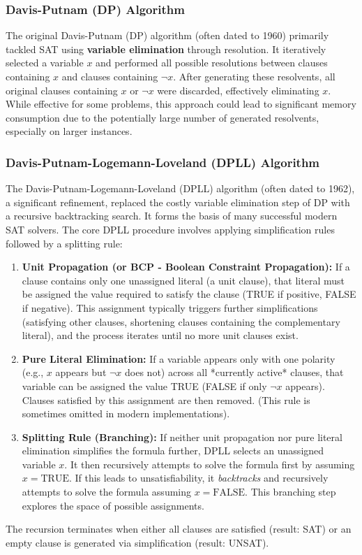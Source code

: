 \documentclass[12pt, a4paper]{article}
\begin{document}
\subsubsection{Davis-Putnam (DP) Algorithm}
\label{subsubsec:dp}

The original Davis-Putnam (DP) algorithm (often dated to 1960) primarily tackled SAT using \textbf {variable elimination} through resolution. It iteratively selected a variable $x$ and performed all possible resolutions between clauses containing $x$ and clauses containing $\lnot x$. After generating these resolvents, all original clauses containing $x$ or $\lnot x$ were discarded, effectively eliminating $x$. While effective for some problems, this approach could lead to significant memory consumption due to the potentially large number of generated resolvents, especially on larger instances.

\subsubsection{Davis-Putnam-Logemann-Loveland (DPLL) Algorithm}
\label{subsubsec:dpll}

The Davis-Putnam-Logemann-Loveland (DPLL) algorithm (often dated to 1962), a significant refinement, replaced the costly variable elimination step of DP with a recursive backtracking search. It forms the basis of many successful modern SAT solvers. The core DPLL procedure involves applying simplification rules followed by a splitting rule:

\begin{enumerate}
    \item \textbf{Unit Propagation (or BCP - Boolean Constraint Propagation):} If a clause contains only one unassigned literal (a unit clause), that literal must be assigned the value required to satisfy the clause (TRUE if positive, FALSE if negative). This assignment typically triggers further simplifications (satisfying other clauses, shortening clauses containing the complementary literal), and the process iterates until no more unit clauses exist.
    \item \textbf{Pure Literal Elimination:} If a variable appears only with one polarity (e.g., $x$ appears but $\lnot x$ does not) across all *currently active* clauses, that variable can be assigned the value TRUE (FALSE if only $\lnot x$ appears). Clauses satisfied by this assignment are then removed. (This rule is sometimes omitted in modern implementations).
    \item \textbf{Splitting Rule (Branching):} If neither unit propagation nor pure literal elimination simplifies the formula further, DPLL selects an unassigned variable $x$. It then recursively attempts to solve the formula first by assuming $x = \text{TRUE}$. If this leads to unsatisfiability, it \emph{backtracks} and recursively attempts to solve the formula assuming $x = \text{FALSE}$. This branching step explores the space of possible assignments.
\end{enumerate}
The recursion terminates when either all clauses are satisfied (result: SAT) or an empty clause is generated via simplification (result: UNSAT).
\end{document}
